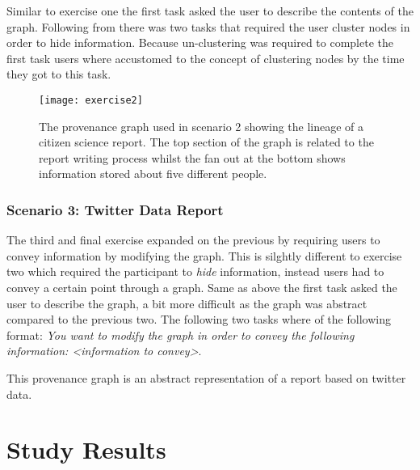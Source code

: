 Similar to exercise one the first task asked the user to describe the contents of the graph. Following from there was two tasks that required the user cluster nodes in order to hide information. Because un-clustering was required to complete the first task users where accustomed to the concept of clustering nodes by the time they got to this task.

\begin{figure}[h]
	\centering
	\texttt{[image: exercise2]}
	\caption{The provenance graph used in scenario 2 showing the lineage of a citizen science report. The top section of the graph is related to the report writing process whilst the fan out  at the bottom shows information stored about five different people.}
	\label{fig:exercise2}
\end{figure}


\subsubsection{Scenario 3: Twitter Data Report}
\label{ssub:Scenario 3: Twitter Data Report}

The third and final exercise expanded on the previous by requiring users to convey information by modifying the graph. This is silghtly different to exercise two which required the participant to \textit{hide} information, instead users had to convey a certain point through a graph. Same as above the first task asked the user to describe the graph, a bit more difficult as the graph was abstract compared to the previous two. The following two tasks where of the following format: \textit{You want to modify the graph in order to convey the following information: <information to convey>}. 

\begin{flushleft}
This provenance graph is an abstract representation of a report based on twitter data. 
\end{flushleft}

\section{Study Results}
\label{sec:study_results}

